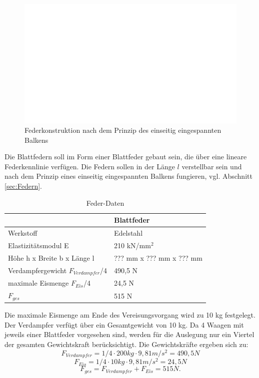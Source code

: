 \begin{figure}
\centering		\includegraphics[page=7,width=1.10\textwidth]{Pictures/Feder.pdf}
\caption{Federkonstruktion nach dem Prinzip des einseitig eingespannten Balkens}
\label{fig:Feder}
\end{figure}






Die Blattfedern soll im Form einer Blattfeder gebaut sein, die über eine lineare Federkennlinie verfügen. Die Federn sollen in der Länge $l$ verstellbar sein und nach dem Prinzip eines einseitig eingespannten Balkens fungieren, vgl. Abschnitt \ref{sec:Federn}. 

 
\begin{table}[htb]
\centering
\caption{Feder-Daten}\vspace{6pt}
\begin{tabular}{ll}
\hline 
 & \textbf{Blattfeder}  \\ 
\hline 
\hline 
Werkstoff & Edelstahl\\
Elastizitätsmodul E & 210 kN/mm$^2$ \\ 
Höhe h x Breite b x Länge l & ??? mm x ??? mm x ??? mm\\
\hline
Verdampfergewicht $F_{Verdampfer}$/4 & 490,5 N\\
\hline
maximale Eismenge $F_{Eis}$/4 & 24,5 N\\
\hline
$F_{ges}$ & 515 N\\

\end{tabular} 
\label{tab:Federblattereigenschaften}
\end{table}

Die maximale Eismenge am Ende des Vereisungsvorgang wird zu 10 kg festgelegt. Der Verdampfer verfügt über ein Gesamtgewicht von 10 kg. Da 4 Waagen mit jeweils einer Blattfeder vorgesehen sind, werden für die Auslegung nur ein Viertel der gesamten Gewichtskraft berücksichtigt.  Die Gewichtskräfte ergeben sich zu:
\begin{equation*}
F_{Verdampfer}= 1/4\cdot 200 kg \cdot 9,81 m/s^2 = 490,5 N
\end{equation*}
\begin{equation*}
F_{Eis}= 1/4 \cdot 10 kg \cdot 9,81 m/s^2 = 24,5 N
\end{equation*}
\begin{equation*}
F_{ges}= F_{Verdampfer} + F_{Eis} = 515 N.
\end{equation*}

